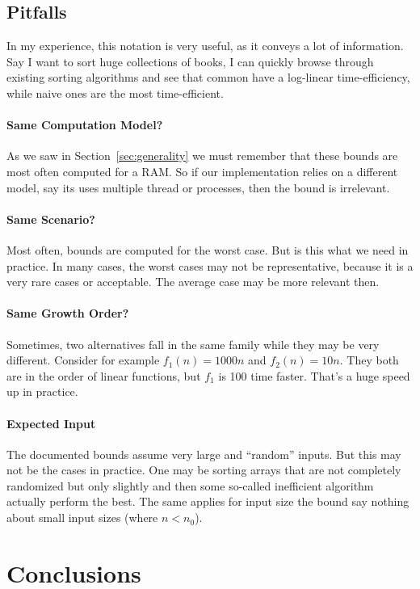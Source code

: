 \documentclass{aldast}
\begin{document}
\subsection{Pitfalls}

In my experience, this notation is very useful, as it conveys a lot of
information. Say I want to sort huge collections of books, I can
quickly browse through existing sorting algorithms and see that common
have a log-linear time-efficiency, while naive ones are the most
time-efficient.

\paragraph{Same Computation Model?} As we saw in
Section~\ref{sec:generality} we must remember that these bounds are
most often computed for a RAM. So if our implementation relies on a
different model, say its uses multiple thread or processes, then the
bound is irrelevant.

\paragraph{Same Scenario?} Most often, bounds are computed for the
worst case. But is this what we need in practice. In many cases, the
worst cases may not be representative, because it is a very rare cases
or acceptable. The average case may be more relevant then.

\paragraph{Same Growth Order?} Sometimes, two alternatives fall in the
same family while they may be very different. Consider for example
$f_1(n) = 1000n$ and $f_2(n)=10n$. They both are in the order of
linear functions, but $f_1$ is 100 time faster. That's a huge speed up
in practice.

\paragraph{Expected Input} The documented bounds assume very large and
``random'' inputs. But this may not be the cases in practice. One may
be sorting arrays that are not completely randomized but only slightly
and then some so-called inefficient algorithm actually perform the
best. The same applies for input size the bound say nothing about
small input sizes (where $n < n_0$).

\section*{Conclusions}
\end{document}

